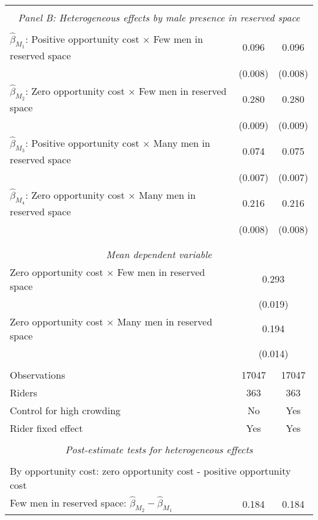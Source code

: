\begin{tabular}{l*{2}{c}}
\hline \\[-1ex] \multicolumn{3}{c}{\textit{Panel B: Heterogeneous effects by male presence in reserved space}} \\\\[-1ex]
$\hat\beta_{M_1}$: Positive opportunity cost $\times$ Few men in reserved space&       0.096\sym{***}&       0.096\sym{***}\\
                    &     (0.008)         &     (0.008)         \\
[1em]
$\hat\beta_{M_2}$: Zero opportunity cost $\times$ Few men in reserved space&       0.280\sym{***}&       0.280\sym{***}\\
                    &     (0.009)         &     (0.009)         \\
[1em]
$\hat\beta_{M_3}$: Positive opportunity cost $\times$ Many men in reserved space&       0.074\sym{***}&       0.075\sym{***}\\
                    &     (0.007)         &     (0.007)         \\
[1em]
$\hat\beta_{M_4}$: Zero opportunity cost $\times$ Many men in reserved space&       0.216\sym{***}&       0.216\sym{***}\\
                    &     (0.008)         &     (0.008)         \\
\\[-1.8ex] \hline \\[-1.8ex] \multicolumn{3}{c}{\textit{Mean dependent variable}} \\ Zero opportunity cost $\times$ Few men in reserved space & \multicolumn{2}{c}{0.293} \\ & \multicolumn{2}{c}{(0.019)} \\ Zero opportunity cost $\times$ Many men in reserved space & \multicolumn{2}{c}{0.194} \\ & \multicolumn{2}{c}{(0.014)} \\\\[-1ex] 
Observations        &       17047         &       17047         \\
Riders              &         363         &         363         \\
Control for high crowding&          No         &         Yes         \\
Rider fixed effect  &         Yes         &         Yes         \\
\hline \\[-1ex]  \multicolumn{3}{c}{\textit{Post-estimate tests for heterogeneous effects}} \\\\[-1ex] \multicolumn{3}{l}{By opportunity cost: zero opportunity cost - positive opportunity cost} \\ \quad Few men in reserved space: $\hat\beta_{M_2} - \hat\beta_{M_1}$&       0.184         &       0.184         \\

\end{tabular}
